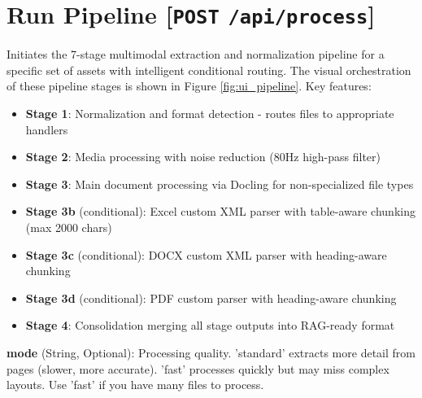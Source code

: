 \section*{Run Pipeline [\texttt{POST} \texttt{/api/process}]}
Initiates the 7-stage multimodal extraction and normalization pipeline for a specific set of assets with intelligent conditional routing. The visual orchestration of these pipeline stages is shown in Figure \ref{fig:ui_pipeline}. Key features:
\begin{itemize}
    \item \textbf{Stage 1}: Normalization and format detection - routes files to appropriate handlers
    \item \textbf{Stage 2}: Media processing with noise reduction (80Hz high-pass filter)
    \item \textbf{Stage 3}: Main document processing via Docling for non-specialized file types
    \item \textbf{Stage 3b} (conditional): Excel custom XML parser with table-aware chunking (max 2000 chars)
    \item \textbf{Stage 3c} (conditional): DOCX custom XML parser with heading-aware chunking
    \item \textbf{Stage 3d} (conditional): PDF custom parser with heading-aware chunking
    \item \textbf{Stage 4}: Consolidation merging all stage outputs into RAG-ready format
\end{itemize}

\textbf{mode} (String, Optional): Processing quality. 'standard' extracts more detail from pages (slower, more accurate). 'fast' processes quickly but may miss complex layouts. Use 'fast' if you have many files to process. 

